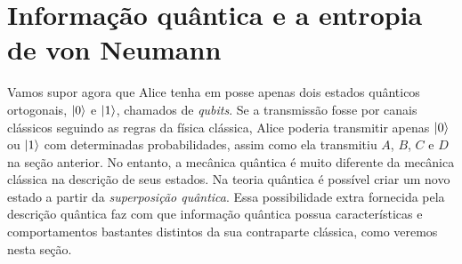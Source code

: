 \documentclass{article}
\begin{document}
\section{Informação quântica e a entropia de von Neumann}


Vamos supor agora que Alice tenha em posse apenas dois estados quânticos ortogonais, $\ket{0}$ e $\ket{1}$, chamados de \textit{qubits}. Se a transmissão fosse por canais clássicos seguindo as regras da física clássica, Alice poderia transmitir apenas $\ket{0}$ ou $\ket{1}$ com determinadas probabilidades, assim como ela transmitiu $A$, $B$, $C$ e $D$ na seção anterior. No entanto, a mecânica quântica é muito diferente da mecânica clássica na descrição de seus estados. Na teoria quântica é possível criar um novo estado a partir da \textit{superposição quântica}. Essa possibilidade extra fornecida pela descrição quântica faz com que informação quântica possua características e comportamentos bastantes distintos da sua contraparte clássica, como veremos nesta seção.
\end{document}

